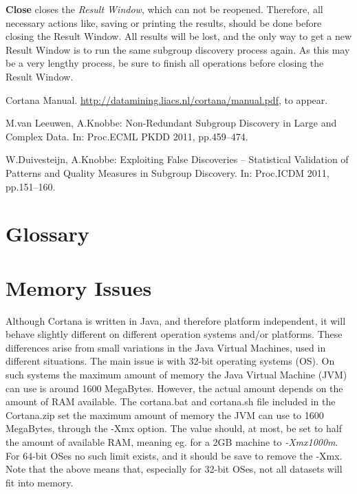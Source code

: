 \documentclass{article}
\begin{document}
\textbf{Close} closes the \emph{Result Window}, which can not be reopened. 
Therefore, all necessary actions like, saving or printing the results,
should be done before closing the Result Window.  All results will be lost,
and the only way to get a new Result Window is to run the same subgroup
discovery process again.  As this may be a very lengthy process, be sure to
finish all operations before closing the Result Window.


\begin{thebibliography}{9}

Cortana Manual. \url{http://datamining.liacs.nl/cortana/manual.pdf}, to appear.

M.\@ van Leeuwen, A.\@ Knobbe: Non-Redundant Subgroup Discovery in Large and
Complex Data. In: Proc.\@ ECML PKDD 2011, pp.\@ 459--474.

W.\@ Duivesteijn, A.\@ Knobbe: Exploiting False Discoveries -- Statistical
Validation of Patterns and Quality Measures in Subgroup Discovery. In:
Proc.\@ ICDM 2011, pp.\@ 151--160.

\end{thebibliography}

\appendix
\clearpage


\section{Glossary}
\vspace{-10mm}
\renewcommand*{\glossaryname}{}
\printglossaries


\section{Memory Issues}
\label{sec:memory}

Although Cortana is written in Java, and therefore platform independent, it will behave slightly different on different operation systems and/or platforms.
These differences arise from small variations in the Java Virtual Machines, used in different situations.
The main issue is with 32-bit operating systems (OS).
On such systems the maximum amount of memory the Java Virtual Machine (JVM) can use is around 1600 MegaBytes.
However, the actual amount depends on the amount of RAM available.
The cortana.bat and cortana.sh file included in the Cortana.zip set the maximum amount of memory the JVM can use to 1600 MegaBytes, through the -Xmx option.
The value should, at most, be set to half the amount of available RAM, meaning eg. for a 2GB machine to \emph{-Xmx1000m}.
For 64-bit OSes no such limit exists, and it should be save to remove the -Xmx.
Note that the above means that, especially for 32-bit OSes, not all datasets will fit into memory.
\end{document}
